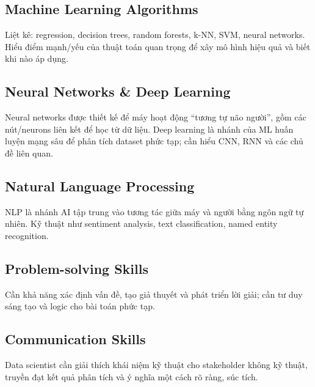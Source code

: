 \subsection{Machine Learning Algorithms}

\begin{ynghia}[title={Kiến thức thuật toán}]
Liệt kê: regression, decision trees, random forests, k-NN, SVM, neural networks.
Hiểu điểm mạnh/yếu của thuật toán quan trọng để xây mô hình hiệu quả và biết khi nào áp dụng.
\end{ynghia}

\subsection{Neural Networks \& Deep Learning}

\begin{ynghia}[title={NN và DL}]
Neural networks được thiết kế để máy hoạt động “tương tự não người”, gồm các nút/neurons liên kết để học từ dữ liệu.
Deep learning là nhánh của ML huấn luyện mạng sâu để phân tích dataset phức tạp; cần hiểu CNN, RNN và các chủ đề liên quan.
\end{ynghia}

\subsection{Natural Language Processing}

\begin{ynghia}[title={NLP}]
NLP là nhánh AI tập trung vào tương tác giữa máy và người bằng ngôn ngữ tự nhiên.
Kỹ thuật như sentiment analysis, text classification, named entity recognition.
\end{ynghia}

\subsection{Problem-solving Skills}

\begin{ynghia}[title={Kỹ năng giải quyết vấn đề}]
Cần khả năng xác định vấn đề, tạo giả thuyết và phát triển lời giải; cần tư duy sáng tạo và logic cho bài toán phức tạp.
\end{ynghia}

\subsection{Communication Skills}

\begin{ynghia}[title={Kỹ năng giao tiếp}]
Data scientist cần giải thích khái niệm kỹ thuật cho stakeholder không kỹ thuật, truyền đạt kết quả phân tích và ý nghĩa một cách rõ ràng, súc tích.
\end{ynghia}

